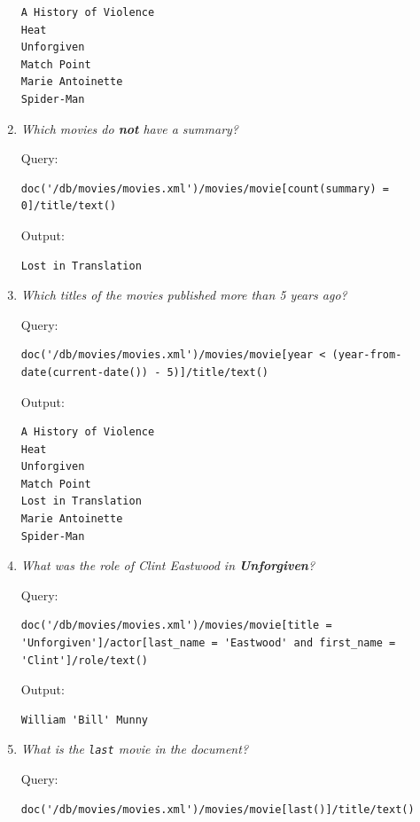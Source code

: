 \documentclass[a4paper, notitlepage]{article}
\begin{document}
\begin{enumerate}
\begin{lstlisting}
A History of Violence
Heat
Unforgiven
Match Point
Marie Antoinette
Spider-Man
\end{lstlisting}


\item
  \emph{Which movies do \textbf{not} have a summary?}
  
Query:
  
\begin{lstlisting}
doc('/db/movies/movies.xml')/movies/movie[count(summary) = 0]/title/text()
\end{lstlisting}
  
Output:
  
\begin{lstlisting}
Lost in Translation
\end{lstlisting}

\item
  \emph{Which titles of the movies published more than 5 years ago? }
  
Query:
  
\begin{lstlisting}
doc('/db/movies/movies.xml')/movies/movie[year < (year-from-date(current-date()) - 5)]/title/text()
\end{lstlisting}
  
Output:
  
\begin{lstlisting}
A History of Violence
Heat
Unforgiven
Match Point
Lost in Translation
Marie Antoinette
Spider-Man
\end{lstlisting}

\item
  \emph{ What was the role of Clint Eastwood in \textbf{Unforgiven}? }
  
Query:
  
\begin{lstlisting}
doc('/db/movies/movies.xml')/movies/movie[title = 'Unforgiven']/actor[last_name = 'Eastwood' and first_name = 'Clint']/role/text()
\end{lstlisting}
  
Output:
  
\begin{lstlisting}
William 'Bill' Munny
\end{lstlisting}
  

\item
  \emph{ What is the \lstinline{last} movie in the document? }
  
Query:
  
\begin{lstlisting}
doc('/db/movies/movies.xml')/movies/movie[last()]/title/text()
\end{lstlisting}
  

\end{enumerate}
\end{document}
